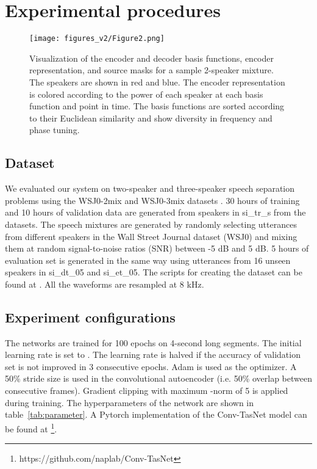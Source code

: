 \documentclass[journal]{IEEEtran}
\begin{document}
\section{Experimental procedures}
\label{sec:procedures}
\begin{figure*}[!htp]
	\small
	\centering
	\texttt{[image: figures\_v2/Figure2.png]}
	\caption{Visualization of the encoder and decoder basis functions, encoder representation, and source masks for a sample 2-speaker mixture. The speakers are shown in red and blue. The encoder representation is colored according to the power of each speaker at each basis function and point in time. The basis functions are sorted according to their Euclidean similarity and show diversity in frequency and phase tuning.}
	\label{fig:sample}
\end{figure*}

\subsection{Dataset}

We evaluated our system on two-speaker and three-speaker speech separation problems using the WSJ0-2mix and WSJ0-3mix datasets \cite{hershey2016deep}. 30 hours of training and 10 hours of validation data are generated from speakers in si\_tr\_s from the datasets. The speech mixtures are generated by randomly selecting utterances from different speakers in the Wall Street Journal dataset (WSJ0) and mixing them at random signal-to-noise ratios (SNR) between -5 dB and 5 dB. 5 hours of evaluation set is generated in the same way using utterances from 16 unseen speakers in si\_dt\_05 and si\_et\_05. The scripts for creating the dataset can be found at \cite{web2017deep}. All the waveforms are resampled at 8 kHz.

\subsection{Experiment configurations}
\label{sec:config}

The networks are trained for 100 epochs on 4-second long segments. The initial learning rate is set to . The learning rate is halved if the accuracy of validation set is not improved in 3 consecutive epochs. Adam \cite{kingma2014adam} is used as the optimizer. A 50\% stride size is used in the convolutional autoencoder (i.e. 50\% overlap between consecutive frames). Gradient clipping with maximum -norm of 5 is applied during training. The hyperparameters of the network are shown in table~\ref{tab:parameter}. A Pytorch implementation of the Conv-TasNet model can be found at \footnote{https://github.com/naplab/Conv-TasNet}.
\end{document}
